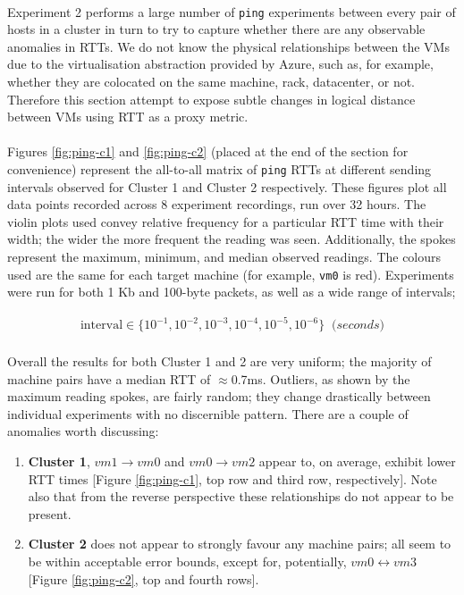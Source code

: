 \documentclass[a4paper,10pt]{article}
\begin{document}
\paragraph{} Experiment 2 performs a large number of \texttt{ping} experiments between every pair of hosts in a cluster in turn to try to capture whether there are any observable anomalies in RTTs. We do not know the physical relationships between the VMs due to the virtualisation abstraction provided by Azure, such as, for example, whether they are colocated on the same machine, rack, datacenter, or not. Therefore this section attempt to expose subtle changes in logical distance between VMs using RTT as a proxy metric.

\paragraph{} Figures \ref{fig:ping-c1} and \ref{fig:ping-c2} (placed at the end of the section for convenience) represent the all-to-all matrix of \texttt{ping} RTTs at different sending intervals observed for Cluster 1 and Cluster 2 respectively. These figures plot all data points recorded across 8 experiment recordings, run over 32 hours. The violin plots used convey relative frequency for a particular RTT time with their width; the wider the more frequent the reading was seen. Additionally, the spokes represent the maximum, minimum, and median observed readings. The colours used are the same for each target machine (for example, \texttt{vm0} is red). Experiments were run for both 1 Kb and 100-byte packets, as well as a wide range of intervals;

\vspace{-3mm}
\begin{align*}
    \text{interval} \in \{ 10^{-1}, 10^{-2}, 10^{-3}, 10^{-4}, 10^{-5}, 10^{-6} \} \; \; \textit{(seconds)}
\end{align*}

\paragraph{} Overall the results for both Cluster 1 and 2 are very uniform; the majority of machine pairs have a median RTT of $\approx$0.7ms. Outliers, as shown by the maximum reading spokes, are fairly random; they change drastically between individual experiments with no discernible pattern. There are a couple of anomalies worth discussing:
\begin{enumerate}
    \item \textbf{Cluster 1}, $vm1 \rightarrow vm0$ and $vm0 \rightarrow vm2$ appear to, on average, exhibit lower RTT times [Figure \ref{fig:ping-c1}, top row and third row, respectively]. Note also that from the reverse perspective these relationships do not appear to be present.
    \item \textbf{Cluster 2} does not appear to strongly favour any machine pairs; all seem to be within acceptable error bounds, except for, potentially, $vm0 \leftrightarrow vm3$ [Figure \ref{fig:ping-c2}, top and fourth rows].
\end{enumerate}
\end{document}
